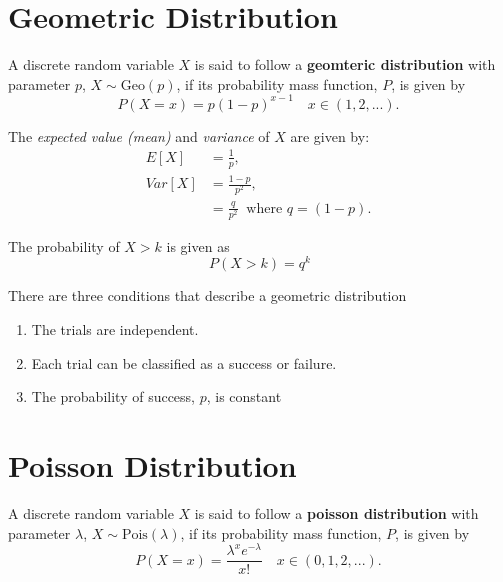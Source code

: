 \section{Geometric Distribution} \label{mod2:section:Geometric}
\begin{defn}\label{mod2:defn:Geomtric}
	A discrete random variable $X$ is said to follow a \textbf{geomteric distribution} with parameter $p$, $X \sim \text{Geo}(p)$, if its probability mass function, $P$, is given by
\begin{equation}
P(X = x) = p(1-p)^{x-1} \quad x \in (1, 2, ...). \label{mod2:eq:GeometricDist} \ 
\end{equation} 
\end{defn}

\begin{note}
	The \textit{expected value (mean)} and \textit{variance} of $X$ are given by:
	\begin{align}
	E[X] &= \frac{1}{p},  \label{mod2:eq:Geometric:Mean} \\ 
	Var[X] &= \frac{1-p}{p^2}, \label{mod2:eq:Geomtric:Variance} \\
	&= \frac{q}{p^2}  \: \text{ where } q = (1-p).\ 
	\end{align}
\end{note}

\begin{note} \label{mod2:eq:Geometric:Prop}
	The probability of $X>k$ is given as
	\begin{equation}
		P(X>k)=q^k
	\end{equation}
\end{note}
\begin{note} \label{mod2:note:Geometric:Conditions}
	There are three conditions that describe a geometric distribution
	\begin{enumerate}[label = (\roman*)]
		\item The trials are independent.
		\item Each trial can be classified as a success or failure.
		\item The probability of success, $p$, is constant
	\end{enumerate}
\end{note}



\section{Poisson Distribution}\label{mod2:section:Poisson}
\begin{defn} \label{mod2:defn:Poisson}
	A discrete random variable $X$ is said to follow a \textbf{poisson distribution} with parameter $\lambda$, $X \sim \text{Pois}(\lambda)$, if its probability mass function, $P$, is given by
\begin{equation}
P(X = x) =\frac{ \lambda ^ x e^{-\lambda}}{x!} \quad x \in (0, 1, 2, ...). \label{mod2:eq:PoissonDist} \ 
\end{equation} 
\end{defn}


